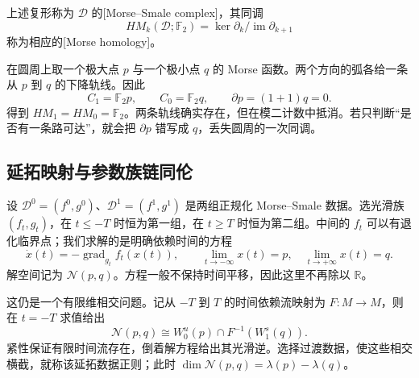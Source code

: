 \begin{definition}\label{g2:def:morse-smale-homology}
	上述复形称为 \(\mathcal D\) 的[Morse--Smale complex]，其同调
	\[
		HM_k(\mathcal D;\mathbb F_2)
		=\ker\partial_k/\operatorname{im}\partial_{k+1}
	\]
	称为相应的[Morse homology]。
\end{definition}

\begin{example}\label{g2:exm:circle-morse-complex}
	在圆周上取一个极大点 \(p\) 与一个极小点 \(q\) 的 Morse 函数。两个方向的弧各给一条从 \(p\) 到 \(q\) 的下降轨线。因此
	\[
		C_1=\mathbb F_2p,\qquad C_0=\mathbb F_2q,\qquad
		\partial p=(1+1)q=0.
	\]
	得到 \(HM_1=HM_0=\mathbb F_2\)。两条轨线确实存在，但在模二计数中抵消。若只判断“是否有一条路可达”，就会把 \(\partial p\) 错写成 \(q\)，丢失圆周的一次同调。
\end{example}

\subsection{延拓映射与参数族链同伦}
\label{g2:subsec:1804:02}

设 \(\mathcal D^0=(f^0,g^0)\)、\(\mathcal D^1=(f^1,g^1)\) 是两组正规化 Morse--Smale 数据。选光滑族 \((f_t,g_t)\)，在 \(t\le-T\) 时恒为第一组，在 \(t\ge T\) 时恒为第二组。中间的 \(f_t\) 可以有退化临界点；我们求解的是明确依赖时间的方程
\begin{equation}\label{g2:eq:morse-continuation-equation}
	\dot x(t)=-\operatorname{grad}_{g_t}f_t(x(t)),\qquad
	\lim_{t\to-\infty}x(t)=p,\quad
	\lim_{t\to+\infty}x(t)=q.
\end{equation}
解空间记为 \(\mathcal N(p,q)\)。方程一般不保持时间平移，因此这里不再除以 \(\mathbb R\)。

\ProseParagraphBreak

这仍是一个有限维相交问题。记从 \(-T\) 到 \(T\) 的时间依赖流映射为 \(F:M\to M\)，则在 \(t=-T\) 求值给出
\begin{equation}\label{g2:eq:continuation-finite-intersection}
	\mathcal N(p,q)\cong
	W^u_0(p)\cap F^{-1}(W^s_1(q)).
\end{equation}
紧性保证有限时间流存在，倒着解方程给出其光滑逆。选择过渡数据，使这些相交横截，就称该延拓数据正则；此时 \(\dim\mathcal N(p,q)=\lambda(p)-\lambda(q)\)。

